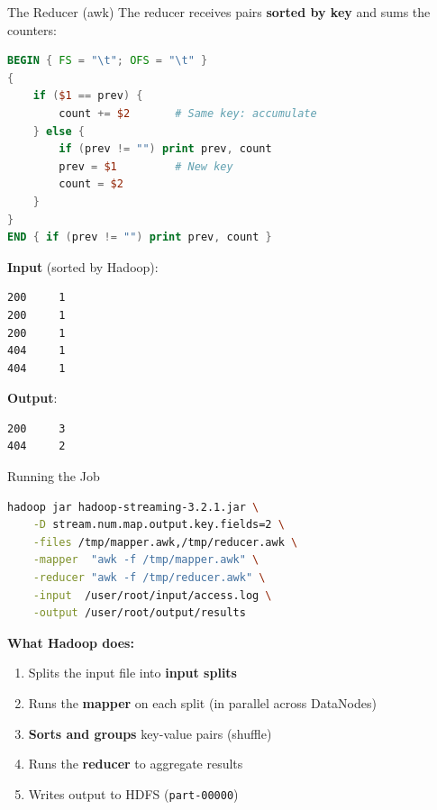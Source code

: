 \documentclass[aspectratio=169, 11pt]{beamer}
\begin{document}
\begin{frame}[fragile]{The Reducer (awk)}
  The reducer receives pairs \textbf{sorted by key} and sums the counters:

  \begin{lstlisting}[language=awk]
BEGIN { FS = "\t"; OFS = "\t" }
{
    if ($1 == prev) {
        count += $2       # Same key: accumulate
    } else {
        if (prev != "") print prev, count
        prev = $1         # New key
        count = $2
    }
}
END { if (prev != "") print prev, count }
  \end{lstlisting}

  \vspace{0.3em}
  \textbf{Input} (sorted by Hadoop):
  \begin{lstlisting}[basicstyle=\ttfamily\small]
200     1
200     1
200     1
404     1
404     1
  \end{lstlisting}

  \textbf{Output}:
  \begin{lstlisting}[basicstyle=\ttfamily\small]
200     3
404     2
  \end{lstlisting}
\end{frame}

\begin{frame}[fragile]{Running the Job}
  \begin{lstlisting}[language=bash, basicstyle=\ttfamily\scriptsize]
hadoop jar hadoop-streaming-3.2.1.jar \
    -D stream.num.map.output.key.fields=2 \
    -files /tmp/mapper.awk,/tmp/reducer.awk \
    -mapper  "awk -f /tmp/mapper.awk" \
    -reducer "awk -f /tmp/reducer.awk" \
    -input  /user/root/input/access.log \
    -output /user/root/output/results
  \end{lstlisting}

  \vspace{0.5em}
  \textbf{What Hadoop does:}
  \begin{enumerate}
    \item Splits the input file into \textbf{input splits}
    \item Runs the \textbf{mapper} on each split (in parallel across DataNodes)
    \item \textbf{Sorts and groups} key-value pairs (shuffle)
    \item Runs the \textbf{reducer} to aggregate results
    \item Writes output to HDFS (\texttt{part-00000})
  \end{enumerate}
\end{frame}
\end{document}
